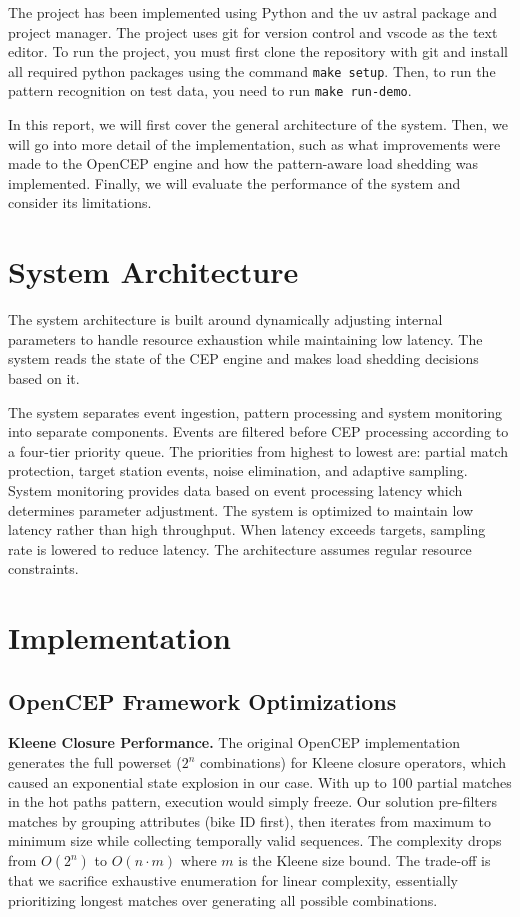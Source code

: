 \documentclass[sigconf]{acmart}
\begin{document}
The project has been implemented using Python and the uv astral package and project manager. The project uses git for version control and vscode as the text editor. To run the project, you must first clone the repository with git and install all required python packages using the command \lstinline{make setup}. Then, to run the pattern recognition on test data, you need to run \lstinline{make run-demo}.

In this report, we will first cover the general architecture of the system. Then, we will go into more detail of the implementation, such as what improvements were made to the OpenCEP engine and how the pattern-aware load shedding was implemented. Finally, we will evaluate the performance of the system and consider its limitations.

\section{System Architecture}

The system architecture is built around dynamically adjusting internal parameters to handle resource exhaustion while maintaining low latency. The system reads the state of the CEP engine and makes load shedding decisions based on it.

The system separates event ingestion, pattern processing and system monitoring into separate components. Events are filtered before CEP processing according to a four-tier priority queue. The priorities from highest to lowest are: partial match protection, target station events, noise elimination, and adaptive sampling. System monitoring provides data based on event processing latency which determines parameter adjustment. The system is optimized to maintain low latency rather than high throughput. When latency exceeds targets, sampling rate is lowered to reduce latency. The architecture assumes regular resource constraints.


\section{Implementation}

\subsection{OpenCEP Framework Optimizations}

\textbf{Kleene Closure Performance.} The original OpenCEP implementation generates the full powerset ($2^n$ combinations) for Kleene closure operators, which caused an exponential state explosion in our case. With up to 100 partial matches in the hot paths pattern, execution would simply freeze. Our solution pre-filters matches by grouping attributes (bike ID first), then iterates from maximum to minimum size while collecting temporally valid sequences. The complexity drops from $O(2^n)$ to $O(n \cdot m)$ where $m$ is the Kleene size bound. The trade-off is that we sacrifice exhaustive enumeration for linear complexity, essentially prioritizing longest matches over generating all possible combinations.
\end{document}
